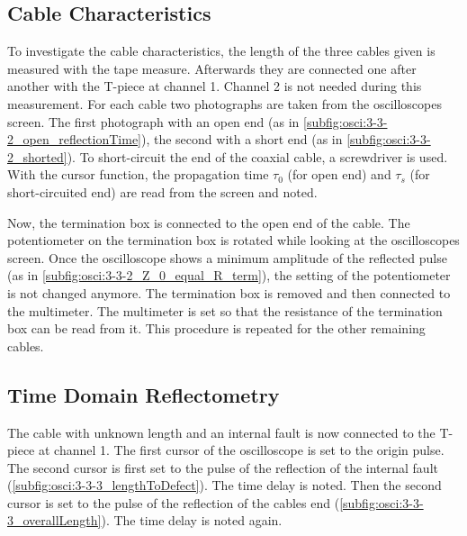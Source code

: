         \subsection{Cable Characteristics}\label{subsec:exec:cable_char}
            To investigate the cable characteristics, the length of the three cables given is measured with the tape measure.
            Afterwards they are connected one after another with the T-piece at channel 1. Channel 2 is not needed during this
            measurement. For each cable two photographs are taken from the oscilloscopes screen. The first photograph with an open
            end (as in \cref{subfig:osci:3-3-2_open_reflectionTime}), the second with a short end (as in \cref{subfig:osci:3-3-2_shorted}).
            To short-circuit the end of the coaxial cable, a screwdriver is used. With the cursor function, the propagation
            time \(\tau_0\) (for open end) and \(\tau_s\) (for short-circuited end) are read from the screen and noted.\par
            Now, the termination box is connected to the open end of the cable. The potentiometer on the termination box is rotated
            while looking at the oscilloscopes screen. Once the oscilloscope shows a minimum amplitude of the reflected pulse (as in \cref{subfig:osci:3-3-2_Z_0_equal_R_term}), the
            setting of the potentiometer is not changed anymore. The termination box is removed and then connected to the multimeter.
            The multimeter is set so that the resistance of the termination box can be read from it. This procedure is repeated for
            the other remaining cables.
        \subsection{Time Domain Reflectometry}\label{subsec:exec:TDR}
            The cable with unknown length and an internal fault is now connected to the T-piece at channel 1. The first cursor of the
            oscilloscope is set to the origin pulse. The second cursor is first set to the pulse of the reflection of the internal
            fault (\cref{subfig:osci:3-3-3_lengthToDefect}). The time delay is noted. Then the second cursor is set to the pulse
            of the reflection of the cables end (\cref{subfig:osci:3-3-3_overallLength}). The time delay is noted again.